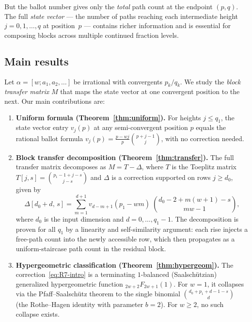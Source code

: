 \documentclass[11pt]{article}
\theoremstyle{definition}
\theoremstyle{remark}
\newcommand{\pFq}[2]{{}_{#1}F_{#2}}
\begin{document}
But the ballot number gives only the \emph{total} path count at the
endpoint $(p, q)$.
The full \emph{state vector} --- the number of paths reaching each
intermediate height $j = 0, 1, \ldots, q$ at position~$p$ ---
contains richer information and is essential for composing blocks
across multiple continued fraction levels.

\subsection{Main results}

Let $\alpha = [w; a_1, a_2, \ldots]$ be irrational with convergents
$p_k/q_k$.
We study the \emph{block transfer matrix} $M$ that maps the state
vector at one convergent position to the next.
Our main contributions are:

\begin{enumerate}
\item \textbf{Uniform formula (Theorem~\ref{thm:uniform}).}
  For heights $j \leq q_1$, the state vector entry $v_j(p)$ at any
  semi-convergent position $p$ equals the rational ballot formula
  $v_j(p) = \frac{p - wj}{p}\binom{p+j-1}{j}$, with no correction
  needed.

\item \textbf{Block transfer decomposition
  (Theorem~\ref{thm:transfer}).}
  The full transfer matrix decomposes as $M = T - \Delta$, where
  $T$ is the Toeplitz matrix
  $T[j,s] = \binom{p_1 - 1 + j - s}{j - s}$ and $\Delta$ is
  a correction supported on rows $j \geq d_0$, given by
  \begin{equation}\label{eq:R7-intro}
    \Delta[d_0{+}d,\, s] = \sum_{m=1}^{d+1}
      v_{d-m+1}(p_1 - wm)\;\binom{d_0 - 2 + m(w{+}1) - s}{mw - 1},
  \end{equation}
  where $d_0$ is the input dimension and $d = 0, \ldots, q_1 - 1$.
  The decomposition is proven for all $q_1$ by a linearity and
  self-similarity argument: each rise injects a free-path count
  into the newly accessible row, which then propagates as a
  uniform-staircase path count in the residual block.

\item \textbf{Hypergeometric classification
  (Theorem~\ref{thm:hypergeom}).}
  The correction~\eqref{eq:R7-intro} is a terminating $1$-balanced
  (Saalsch\"utzian) generalized hypergeometric function
  $\pFq{2w+2}{2w+1}(1)$.
  For $w = 1$, it collapses via the Pfaff--Saalsch\"utz theorem to
  the single binomial $\binom{d_0 + p_1 + d - 1 - s}{d}$ (the
  Rothe--Hagen identity with parameter $b = 2$).
  For $w \geq 2$, no such collapse exists.


\end{enumerate}
\end{document}
